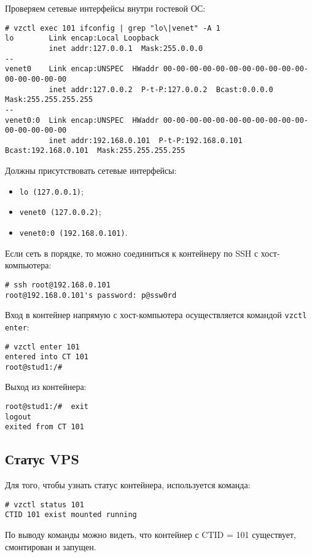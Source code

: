 Проверяем сетевые интерфейсы внутри гостевой ОС:
\begin{lstlisting}
# vzctl exec 101 ifconfig | grep "lo\|venet" -A 1
lo        Link encap:Local Loopback  
          inet addr:127.0.0.1  Mask:255.0.0.0
--
venet0    Link encap:UNSPEC  HWaddr 00-00-00-00-00-00-00-00-00-00-00-00-00-00-00-00  
          inet addr:127.0.0.2  P-t-P:127.0.0.2  Bcast:0.0.0.0  Mask:255.255.255.255
--
venet0:0  Link encap:UNSPEC  HWaddr 00-00-00-00-00-00-00-00-00-00-00-00-00-00-00-00  
          inet addr:192.168.0.101  P-t-P:192.168.0.101  Bcast:192.168.0.101  Mask:255.255.255.255

\end{lstlisting}

Должны присутствовать сетевые интерфейсы:
\begin{itemize}
    \item \texttt{lo (127.0.0.1)};
    \item \texttt{venet0 (127.0.0.2)};
    \item \texttt{venet0:0 (192.168.0.101)}.
\end{itemize}

Если сеть в порядке, то можно соединиться к контейнеру по SSH с хост-компьютера:
\begin{lstlisting}
# ssh root@192.168.0.101
root@192.168.0.101's password: p@ssw0rd
\end{lstlisting}

Вход в контейнер напрямую с хост-компьютера осуществляется командой \texttt{vzctl enter}:
\begin{lstlisting}
# vzctl enter 101
entered into CT 101
root@stud1:/# 
\end{lstlisting}

Выход из контейнера:
\begin{lstlisting}
root@stud1:/#  exit
logout
exited from CT 101
\end{lstlisting}

\subsection{Статус VPS}
Для того, чтобы узнать статус контейнера, используется команда:
\begin{lstlisting}
# vzctl status 101
CTID 101 exist mounted running
\end{lstlisting}

По выводу команды можно видеть, что контейнер с CTID = 101 существует, смонтирован и запущен.

